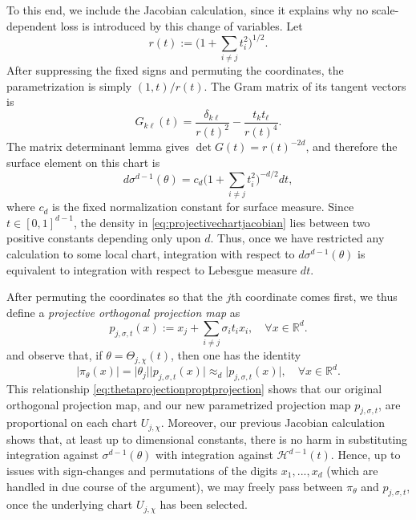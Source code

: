 \documentclass[12pt]{amsart}
\numberwithin{equation}{section}
\begin{document}
To this end, we include the Jacobian calculation, since it explains why no scale-dependent loss is introduced by this change of variables. Let
$$
r(t):=\bigg(1+\sum_{i\neq j}t_i^2\bigg)^{1/2}.
$$
After suppressing the fixed signs and permuting the coordinates, the parametrization is simply $(1,t)/r(t)$. The Gram matrix of its tangent vectors is
$$
G_{k\ell}(t)=\frac{\delta_{k\ell}}{r(t)^2}-\frac{t_kt_\ell}{r(t)^4}.
$$
The matrix determinant lemma gives $\det G(t)=r(t)^{-2d}$, and therefore the surface element on this chart is
\begin{equation}\label{eq:projectivechartjacobian}
d\sigma^{d-1}(\theta)=c_d\bigg(1+\sum_{i\neq j}t_i^2\bigg)^{-d/2}dt,
\end{equation}
where $c_d$ is the fixed normalization constant for surface measure. Since $t\in[0,1]^{d-1}$, the density in \eqref{eq:projectivechartjacobian} lies between two positive constants depending only upon $d$. Thus, once we have restricted any calculation to some local chart, integration with respect to $d\sigma^{d-1}(\theta)$ is equivalent to integration with respect to Lebesgue measure $dt$.

After permuting the coordinates so that the $j$th coordinate comes first, we thus define a \textit{projective orthogonal projection map} as
$$
 p_{j,\sigma,t}(x):=x_j+\sum_{i\ne j}\sigma_i t_i x_i, \quad \forall x \in \mathbb{R}^d.
$$
and observe that, if $\theta = \Theta_{j, \chi} (t)$, then one has the identity
\begin{equation}\label{eq:thetaprojectionproptprojection}
\lvert \pi_{\theta} (x) \rvert = \lvert \theta_j \rvert \lvert  p_{j,\sigma,t} (x) \rvert \approx_d \lvert  p_{j,\sigma,t} (x) \rvert, \quad \forall x \in \mathbb{R}^d.
\end{equation}
This relationship \eqref{eq:thetaprojectionproptprojection} shows that our original orthogonal projection map, and our new parametrized projection map $p_{j, \sigma, t}$, are proportional on each chart $U_{j, \chi}$. Moreover, our previous Jacobian calculation shows that, at least up to dimensional constants, there is no harm in substituting integration against $\sigma^{d-1}(\theta)$ with integration against $\mathcal{H}^{d-1}(t)$. Hence, up to issues with sign-changes and permutations of the digits $x_1,...,x_d$ (which are handled in due course of the argument), we may freely pass between $\pi_{\theta}$ and $p_{j, \sigma, t}$, once the underlying chart $U_{j, \chi}$ has been selected.
\end{document}
